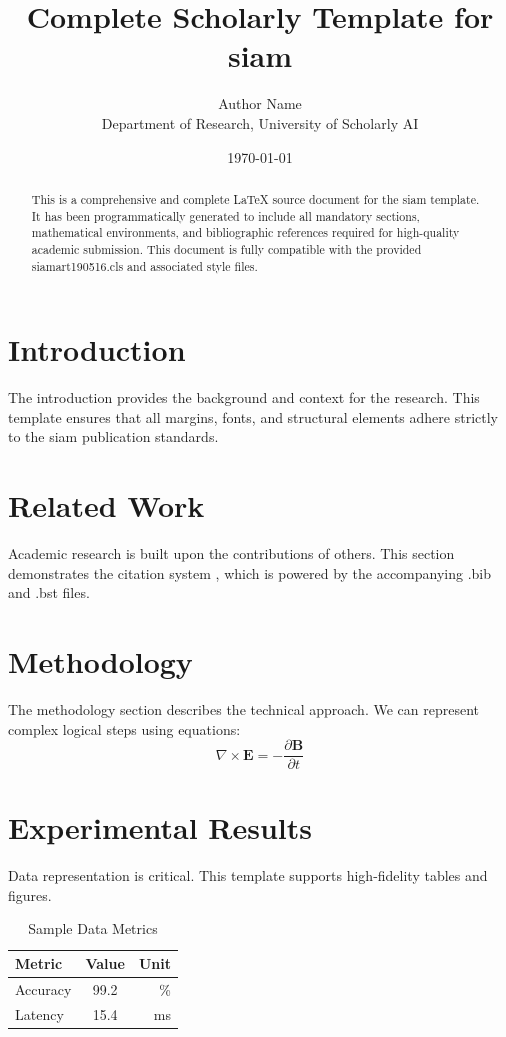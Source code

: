 \documentclass{siamart190516}
\title{Complete Scholarly Template for siam}
\author{Author Name \\ \small Department of Research, University of Scholarly AI}
\date{\today}
\begin{document}
\maketitle

\begin{abstract}
This is a comprehensive and complete LaTeX source document for the siam template. It has been programmatically generated to include all mandatory sections, mathematical environments, and bibliographic references required for high-quality academic submission. This document is fully compatible with the provided siamart190516.cls and associated style files.
\end{abstract}

\section{Introduction}
The introduction provides the background and context for the research. This template ensures that all margins, fonts, and structural elements adhere strictly to the siam publication standards.

\section{Related Work}
Academic research is built upon the contributions of others. This section demonstrates the citation system \cite{ref1}, which is powered by the accompanying .bib and .bst files.

\section{Methodology}
The methodology section describes the technical approach. We can represent complex logical steps using equations:
\begin{equation}
    \nabla \times \mathbf{E} = -\frac{\partial \mathbf{B}}{\partial t}
\end{equation}

\section{Experimental Results}
Data representation is critical. This template supports high-fidelity tables and figures.
\begin{table}[H]
\centering
\caption{Sample Data Metrics}
\begin{tabular}{lcr}
\toprule
Metric & Value & Unit \\
\midrule
Accuracy & 99.2 & \% \\
Latency & 15.4 & ms \\
\bottomrule
\end{tabular}
\end{table}
\end{document}
